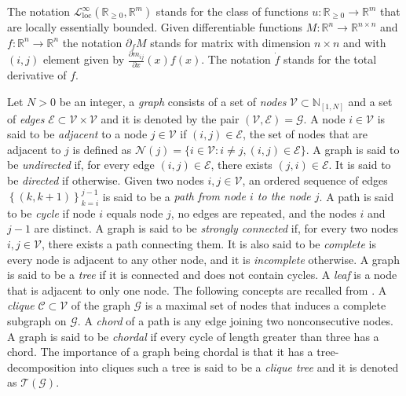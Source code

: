 \documentclass[10pt,twocolumn,twoside]{IEEEtran}
\newcounter{para}
\newcommand\mypara{\par}
\theoremstyle{plain}
\theoremstyle{definition}
\theoremstyle{remark}
\begin{document}
\mypara The notation $\mathcal{L}_{\mathrm{loc}}^\infty(\mathbb{R}_{\geq0},\mathbb{R}^m)$ stands for the class of functions $u:\mathbb{R}_{\geq0}\to\mathbb{R}^m$ that are locally essentially bounded. Given differentiable functions $M:\mathbb{R}^n\to\mathbb{R}^{n\times n}$ and $f:\mathbb{R}^n\to\mathbb{R}^n$ the notation $\partial_fM$ stands for matrix with dimension $n\times n$ and with $(i,j)$ element given by $\frac{\partial m_{ij}}{\partial x}(x)f(x)$. The notation $\dot{f}$ stands for the total derivative of $f$.

\mypara Let $N>0$ be an integer, a \emph{graph} consists of a set of \emph{nodes} $\mathscr{V}\subset\mathbb{N}_{[1,N]}$ and a set of \emph{edges} $\mathscr{E}\subset\mathscr{V}\times\mathscr{V}$ and it is denoted by the pair $(\mathscr{V},\mathscr{E})=\mathscr{G}$. A node $i\in\mathscr{V}$ is said to be \emph{adjacent} to a node $j\in\mathscr{V}$ if $(i,j)\in\mathscr{E}$, the set of nodes that are adjacent to $j$ is defined as $\mathscr{N}(j)=\{i\in\mathscr{V}:i\neq j,(i,j)\in\mathscr{E}\}$. A graph is said to be \emph{undirected} if, for every edge $(i,j)\in\mathscr{E}$, there exists $(j,i)\in\mathscr{E}$. It is said to be \emph{directed} if otherwise. Given two nodes $i,j\in\mathscr{V}$, an ordered sequence of edges $\left\{(k,k+1)\right\}_{k=i}^{j-1}$ is said to be a \emph{path from node $i$ to the node $j$}. A path is said to be \emph{cycle} if node $i$ equals node $j$, no edges are repeated, and the nodes $i$ and $j-1$  are distinct. A graph is said to be \emph{strongly connected} if, for every two nodes $i,j\in\mathscr{V}$, there exists a path connecting them. It is also said to be \emph{complete} is every node is adjacent to any other node, and it is \emph{incomplete} otherwise. A graph is said to be a \emph{tree} if it is connected and does not contain cycles. A \emph{leaf} is a node that is adjacent to only one node. The following concepts are recalled from \cite{PakazadHanssonAndersenEtAl2015,VandenbergheAndersen2015,BlairPeyton1993}. A \emph{clique} $\mathscr{C}\subset\mathscr{V}$ of the graph $\mathscr{G}$ is a maximal set of nodes that induces a complete subgraph on $\mathscr{G}$. A \emph{chord} of a path is any edge joining two nonconsecutive nodes. A graph is said to be \emph{chordal} if every cycle of length greater than three has a chord. The importance of a graph being chordal is that it has a tree-decomposition into cliques  \cite[Proposition~12.3.11]{Diestel2005} such a tree is said to be a \emph{clique tree} and it is denoted as $\mathscr{T}(\mathscr{G})$.
\end{document}
